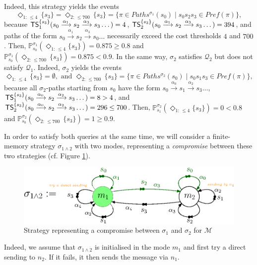 \begin{example}
  Indeed, this strategy yields %
  the events
  \[\Diamond_{1:\, \leq 4}\, \{s_3\} = \Diamond_{2:\, \leq 700}\, \{s_3\} = \{ \pi \in Paths^{\sigma_1}(s_0) \; | \; s_0 %
  s_2 %
  s_3 %
  \in Pref(\pi) \},\]
  because $\text{\sffamily TS}^{\{s_3\}}_1 (s_0 \xrightarrow{\alpha_1}s_2 \xrightarrow{\alpha_3}s_3 \dots) = 4 $,
  $\text{\sffamily TS}^{\{s_3\}}_2 (s_0 \xrightarrow{\alpha_1}s_2 \xrightarrow{\alpha_3}s_3 \dots) = 394 $, and
  paths of the form $s_0 \xrightarrow{\alpha_1}s_2 \xrightarrow{\alpha_3}s_0 \dots$ necessarily exceed the cost thresholds $4$ and $700$.
  Then, $\mathbb{P}_{s_0}^{\sigma_1}(\Diamond_{1:\, \leq 4}\{s_3\}) = 0.875 \geq 0.8$ and $\mathbb{P}_{s_0}^{\sigma_1}(\Diamond_{2: \, \leq 700} \, \{s_3\}) = 0.875<0.9$.
  In the same way, $\sigma_2$ satisfies $\mathcal{Q}_2$ but does not satisfy $\mathcal{Q}_1$.
  Indeed, $\sigma_2$ yields the events
  \[
    \Diamond_{1:\, \leq 4} \, \{s_3\} = \emptyset, \text{ and }
    \Diamond_{2:\, \leq 700} \, \{s_3\} = \{\pi \in Paths^{\sigma_2}(s_0) \; | \; s_0s_1s_3 \in Pref(\pi)\},
  \]
  because all $\sigma_2$-paths starting from $s_0$ have the form $s_0\xrightarrow{\alpha_0}s_1\xrightarrow{\alpha_2}s_3\dots$,
  $\text{\sffamily TS}^{\{s_3\}}_1(s_0\xrightarrow{\alpha_0}s_2\xrightarrow{\alpha_2}s_3\dots) = 8 > 4$, and $\text{\sffamily TS}^{\{s_3\}}_2(s_0\xrightarrow{\alpha_0}s_2\xrightarrow{\alpha_2}s_3 \dots) = 296 \leq 700$. Then,
  $\mathbb{P}_{s_1}^{\sigma_2}(\Diamond_{1:\, \leq 4}\{s_3\}) = 0 < 0.8$ and $\mathbb{P}_{s_0}^{\sigma_2}(\Diamond_{2: \, \leq 700} \, \{s_3\}) = 1 \geq 0.9$.
  \par In order to satisfy both queries at the same
  time, we will consider a finite-memory strategy
  $\sigma_{1\wedge2}$ with two modes, representing
  a \textit{compromise} between these two strategies (cf.
  Figure \ref{strat-compromise}).
  \begin{figure}[h]
    \centering
    \includegraphics[width=0.7\linewidth]{resources/strategy2}
    \caption{Strategy representing a compromise between $\sigma_1$ and $\sigma_2$ for $\mathcal{M}$}
    \label{strat-compromise}
  \end{figure}
  Indeed, we assume that $\sigma_{1 \wedge 2}$ is initialised in the mode $m_1$ and first try a direct sending to $n_2$. If it fails, it then sends the message via $n_1$.

\end{example}
